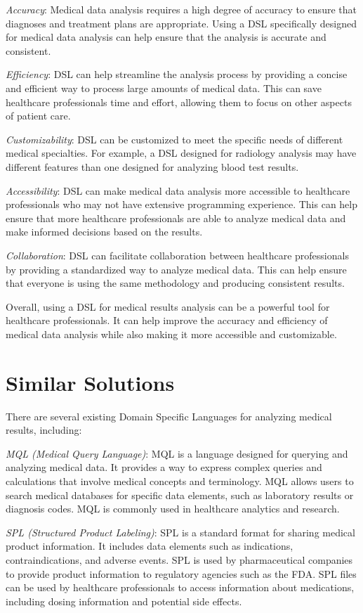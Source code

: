 \emph{Accuracy}: Medical data analysis requires a high degree of accuracy to ensure that diagnoses and treatment plans are appropriate. Using a DSL specifically designed for medical data analysis can help ensure that the analysis is accurate and consistent.

\emph{Efficiency}: DSL can help streamline the analysis process by providing a concise and efficient way to process large amounts of medical data. This can save healthcare professionals time and effort, allowing them to focus on other aspects of patient care.

\emph{Customizability}: DSL can be customized to meet the specific needs of different medical specialties. For example, a DSL designed for radiology analysis may have different features than one designed for analyzing blood test results.

\emph{Accessibility}: DSL can make medical data analysis more accessible to healthcare professionals who may not have extensive programming experience. This can help ensure that more healthcare professionals are able to analyze medical data and make informed decisions based on the results.

\emph{Collaboration}: DSL can facilitate collaboration between healthcare professionals by providing a standardized way to analyze medical data. This can help ensure that everyone is using the same methodology and producing consistent results. \par
Overall, using a DSL for medical results analysis can be a powerful tool for healthcare professionals. It can help improve the accuracy and efficiency of medical data analysis while also making it more accessible and customizable.

\section{Similar Solutions}
There are several existing Domain Specific Languages for analyzing medical results, including:\par
\emph{MQL (Medical Query Language)}: MQL is a language designed for querying and analyzing medical data. It provides a way to express complex queries and calculations that involve medical concepts and terminology. MQL allows users to search medical databases for specific data elements, such as laboratory results or diagnosis codes. MQL is commonly used in healthcare analytics and research.

\emph{SPL (Structured Product Labeling)}: SPL is a standard format for sharing medical product information. It includes data elements such as indications, contraindications, and adverse events. SPL is used by pharmaceutical companies to provide product information to regulatory agencies such as the FDA. SPL files can be used by healthcare professionals to access information about medications, including dosing information and potential side effects.

